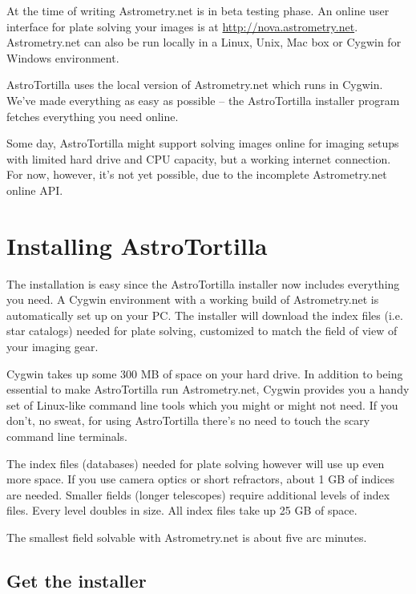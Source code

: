 \documentclass[english]{article}
\newcommand{\surl}[1]{{\small \url{#1}}}
\begin{document}
At the time of writing Astrometry.net is in beta testing phase. An online user
interface for plate solving your images is at
\surl{http://nova.astrometry.net}.  Astrometry.net can also be run locally in a
Linux, Unix, Mac box or Cygwin for Windows environment.

AstroTortilla uses the local version of Astrometry.net which runs in Cygwin. We've made everything as easy as possible -- the AstroTortilla installer program fetches everything you need online.

Some day, AstroTortilla might support solving images online for imaging setups with limited hard drive and CPU capacity, but a working internet connection. For now, however, it's not yet possible, due to the incomplete Astrometry.net online API.

\newpage

\section{Installing AstroTortilla}

The installation is easy since the AstroTortilla installer now includes everything you need. A Cygwin environment with a working build of Astrometry.net is automatically set up on your PC. The installer will download the index files (i.e. star catalogs) needed for plate solving, customized to match the field of view of your imaging gear.

Cygwin takes up some 300 MB of space on your hard drive. In addition to being essential to make AstroTortilla run Astrometry.net, Cygwin provides you a handy set of Linux-like command line tools which you might or might not need. If you don't, no sweat, for using AstroTortilla there's no need to touch the scary command line terminals.

The index files (databases) needed for plate solving however will use up even more
space. If you use camera optics or short refractors, about 1 GB of indices are needed.
Smaller fields (longer telescopes) require additional levels of index files. 
Every level doubles in size. All index files take up 25 GB of space.

The smallest field solvable with Astrometry.net is about five arc minutes. 

\subsection{Get the installer}
\end{document}
